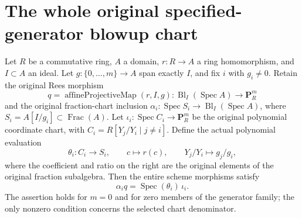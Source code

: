 \section{The whole original specified-generator blowup chart}

\begin{theorem}
\label{thm:resume-blowup-affine-generator-chart-readback}
\leanok
Let $R$ be a commutative ring, $A$ a domain, $r:R\to A$ a ring
homomorphism, and $I\subset A$ an ideal.  Let
$g:\{0,\ldots,m\}\to A$ span exactly $I$, and fix $i$ with $g_i\ne0$.
Retain the original Rees morphism
\[
 q=\operatorname{affineProjectiveMap}(r,I,g):
       \operatorname{Bl}_I(\operatorname{Spec}A)\longrightarrow\mathbf P_R^m
\]
and the original fraction-chart inclusion
$\alpha_i:\operatorname{Spec}S_i\to\operatorname{Bl}_I(\operatorname{Spec}A)$,
where $S_i=A[I/g_i]\subset\operatorname{Frac}(A)$.
Let $\iota_i:\operatorname{Spec}C_i\to\mathbf P_R^m$ be the original
polynomial coordinate chart, with
$C_i=R[Y_j/Y_i\mid j\ne i]$.  Define the actual polynomial evaluation
\[
 \theta_i:C_i\longrightarrow S_i,\qquad
 c\longmapsto r(c),\qquad Y_j/Y_i\longmapsto g_j/g_i,
\]
where the coefficient and ratio on the right are the original elements
of the original fraction subalgebra.  Then the entire scheme morphisms
satisfy
\[
       \alpha_i q=\operatorname{Spec}(\theta_i)\,\iota_i.
\]
The assertion holds for $m=0$ and for zero members of the generator
family; the only nonzero condition concerns the selected chart denominator.
\end{theorem}
